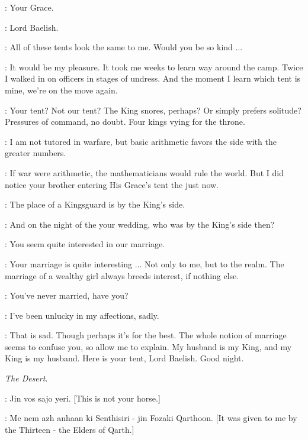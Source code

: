 
\LITTLEFINGER: Your Grace. 

\MARGAERY: Lord Baelish. 

\LITTLEFINGER: All of these tents look the same to me. Would you be so kind $\ldots$  

\MARGAERY: It would be my pleasure. It took me weeks to learn way around the camp. Twice I walked in on officers in stages of undress. And the moment I learn which tent is mine, we're on the move again. 

\LITTLEFINGER: Your tent? Not our tent? The King snores, perhaps? Or simply prefers solitude? Pressures of command, no doubt. Four kings vying for the throne. 

\MARGAERY: I am not tutored in warfare, but basic arithmetic favors the side with the greater numbers. 

\LITTLEFINGER: If war were arithmetic, the mathematicians would rule the world. But I did notice your brother entering His Grace's tent the just now. 

\MARGAERY: The place of a Kingsguard is by the King's side. 

\LITTLEFINGER: And on the night of the your wedding, who was by the King's side then? 

\MARGAERY: You seem quite interested in our marriage. 

\LITTLEFINGER: Your marriage is quite interesting $\ldots$ Not only to me, but to the realm. The marriage of a wealthy girl always breeds interest, if nothing else. 

\MARGAERY: You've never married, have you? 

\LITTLEFINGER: I've been unlucky in my affections, sadly. 

\MARGAERY: That is sad. Though perhaps it's for the best. The whole notion of marriage seems to confuse you, so allow me to explain. My husband is my King, and my King is my husband. Here is your tent, Lord Baelish. Good night. 


\scene

\textit{The Desert.} 


\DAENERYS: Jin vos sajo yeri. [This is not your horse.] 

\KOVARRO: Me nem azh anhaan ki Senthisiri - jin Fozaki Qarthoon. [It was given to me by the Thirteen - the Elders of Qarth.] 

